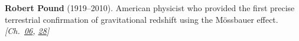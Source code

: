 \textbf{Robert Pound} (1919–2010). American physicist who provided the first precise terrestrial confirmation of gravitational redshift using the M\"{o}ssbauer effect. \emph{[Ch.~\hyperref[ch:gravitytimedilation]{06}, \hyperref[ch:negativetemperature]{28}]}

